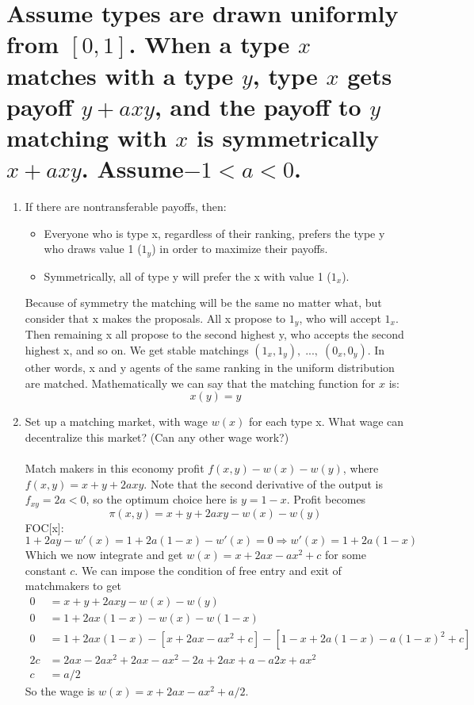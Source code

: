 \documentclass[]{article}
\begin{document}
\section{Assume types are drawn uniformly from $[0,1]$.  When a type $x $ matches with a type $y$, type $x$ gets payoff $y+axy$, and the payoff to $y$ matching with $ x$ is symmetrically $x+axy$.  Assume$-1< a <0$.}

\begin{enumerate}[label = (\alph*)]

\item If there are nontransferable payoffs, then:
\begin{itemize}
    \item Everyone who is type x, regardless of their ranking, prefers the type y who draws value 1 ($1_y$) in order to maximize their payoffs. 
    \item Symmetrically, all of type y will prefer the x with value 1 ($1_x$).  
\end{itemize}
Because of symmetry the matching will be the same no matter what, but consider that x makes the proposals. All x propose to $1_y$, who will accept $1_x$. Then remaining x all propose to the second highest y, who accepts the second highest x, and so on. We get stable matchings $(1_x,1_y),\; ... ,\; (0_x,0_y)$. In other words, x and y agents of the same ranking in the uniform distribution are matched. Mathematically we can say that the matching function for $x$ is:
\[x(y) = y\]


\item Set up a matching market, with wage $w(x)$ for each type x.  What wage can decentralize this market?  (Can any other wage work?)\\
\\
Match makers in this economy profit $f(x,y) -w(x)-w(y)$, where $f(x,y) = x+y+2axy$. Note that the second derivative of the output is $f_{xy} = 2a<0$, so the optimum choice here is $y = 1-x$. Profit becomes
\[\pi(x,y)  = x+y+2axy-w(x)-w(y)\]
FOC[x]:
\[1+2ay-w'(x) = 1+2a(1-x)-w'(x) = 0\Rightarrow 
w'(x) = 1+2a(1-x)\]
Which we now integrate and get $w(x) = x+2ax-ax^2 + c$ for some constant $c$. We can impose the condition of free entry and exit of matchmakers to get 
\begin{align*}
0 & = x+y+2axy-w(x)-w(y) 
\\
0 & = 1+2ax(1-x) -w(x) -w(1-x)
\\
0 & = 1 +2ax(1-x) -[x+2ax-ax^2 + c]
    - [1-x+2a(1-x)-a(1-x)^2 + c]
    \\
2c & = 2ax-2ax^2 +2ax-ax^2-2a+2ax +a-a2x+ax^2
\\
c & = a/2
\end{align*}
So the wage is $w(x) = x+2ax-ax^2 + a/2$. 


\end{enumerate}
\end{document}
